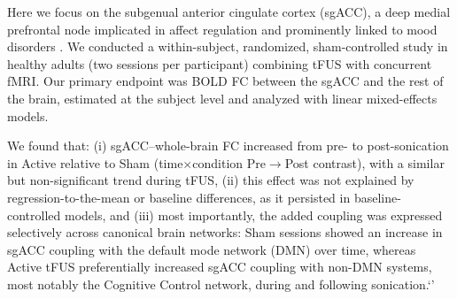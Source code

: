 Here we focus on the subgenual anterior cingulate cortex (sgACC), a deep medial prefrontal node implicated in affect regulation and prominently linked to mood disorders \cite{drevets2008subgenual,greicius2007resting}. We conducted a within-subject, randomized, sham-controlled study in healthy adults (two sessions per participant) combining tFUS with concurrent fMRI. Our primary endpoint was BOLD FC between the sgACC and the rest of the brain, estimated at the subject level and analyzed with linear mixed-effects models.

We found that: (i) sgACC–whole-brain FC increased from pre- to post-sonication in Active relative to Sham (time$\times$condition Pre$\rightarrow$Post contrast), with a similar but non-significant trend during tFUS, (ii) this effect was not explained by regression-to-the-mean or baseline differences, as it persisted in baseline-controlled models, and (iii) most importantly, the added coupling was expressed selectively across canonical brain networks: Sham sessions showed an increase in sgACC coupling with the default mode network (DMN) over time, whereas Active tFUS preferentially increased sgACC coupling with non-DMN systems, most notably the Cognitive Control network, during and following sonication.`'